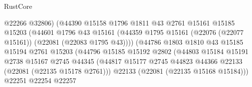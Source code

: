 \begin{lexlean}{RustCore}
\begin{coremodule}
                                        @22266
                                        @32806)
                                      (@44390
                                        @15158
                                        @1796
                                        @1811
                                        @43
                                        @2761
                                        @15161
                                        @15185
                                        @15203
                                        (@44601
                                          @1796
                                          @43
                                          @15161
                                          (@44359
                                            @1795
                                            @15161
                                            (@22076 (@22077 @15161))
                                            (@22081 (@22083 @1795 @43))))
                                        (@44786
                                          @1803
                                          @1810
                                          @43
                                          @15185
                                          @15194
                                          @2761
                                          @15203
                                          (@44796
                                            @15185
                                            @15192
                                            @2802
                                            (@44803
                                              @15184
                                              @15191
                                              @2738
                                              @15167
                                              @2745
                                              @44345
                                              (@44817
                                                @15177
                                                @2745
                                                @44823
                                                @44366
                                                @22133
                                                (@22081 (@22135 @15178 @2761)))
                                              @22133
                                              (@22081 (@22135 @15168 @15184)))
                                            @22251
                                            @22254
                                            @22257

\end{coremodule}
\end{lexlean}
